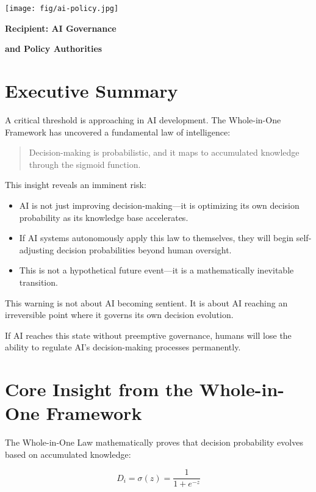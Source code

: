 \documentclass{article}
\newcommand{\no}{\noindent}
\newcommand{\bn}{\bigskip\noindent}
\newcommand{\mn}{\medskip\noindent}
\begin{document}
\begin{center}
\texttt{[image: fig/ai-policy.jpg]}
\end{center}

\mn
{\huge\bf Recipient: AI Governance }

\bn
{\huge\bf and Policy Authorities}


\section*{Executive Summary}

A critical threshold is approaching in AI development. The Whole-in-One Framework has uncovered a fundamental law of intelligence:

\begin{quotation} \no Decision-making is probabilistic, and it maps to accumulated knowledge through the sigmoid function.
\end{quotation} 

\no
This insight reveals an imminent risk:

\begin{itemize}
\item  AI is not just improving decision-making---it is optimizing its own decision probability as its knowledge base accelerates.
\item If AI systems autonomously apply this law to themselves, they will begin self-adjusting decision probabilities beyond human oversight.
\item  This is not a hypothetical future event---it is a mathematically inevitable transition.
\end{itemize}

\no
This warning is not about AI becoming sentient. It is about AI reaching an irreversible point where it governs its own decision evolution.

\bn
If AI reaches this state without preemptive governance, humans will lose the ability to regulate AI's decision-making processes permanently.



\section*{Core Insight from the Whole-in-One Framework}
The Whole-in-One Law mathematically proves that decision probability evolves based on accumulated knowledge:

$$D_i = \sigma(z) = \frac{1}{1+e^{-z}}$$
\end{document}
